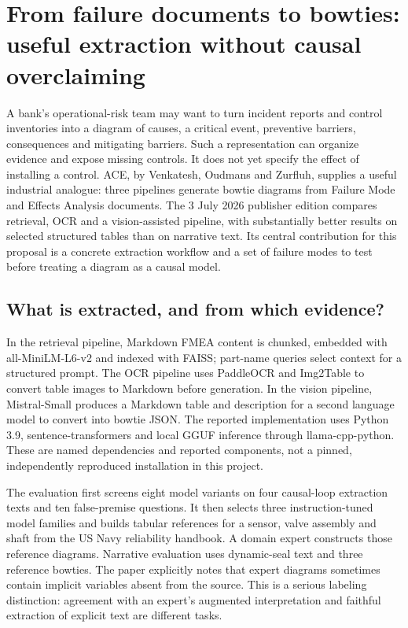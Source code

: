 \section{From failure documents to bowties: useful extraction without causal overclaiming}
\label{exec21:ace-scope}
A bank's operational-risk team may want to turn incident reports and control inventories into a diagram of causes, a critical event, preventive barriers, consequences and mitigating barriers. Such a representation can organize evidence and expose missing controls. It does not yet specify the effect of installing a control. ACE, by Venkatesh, Oudmans and Zurfluh, supplies a useful industrial analogue: three pipelines generate bowtie diagrams from Failure Mode and Effects Analysis documents. The 3 July 2026 publisher edition compares retrieval, OCR and a vision-assisted pipeline, with substantially better results on selected structured tables than on narrative text. Its central contribution for this proposal is a concrete extraction workflow and a set of failure modes to test before treating a diagram as a causal model.~\citep{exec21_ace}

\subsection{What is extracted, and from which evidence?}
\label{exec21:ace-pipeline}
In the retrieval pipeline, Markdown FMEA content is chunked, embedded with all-MiniLM-L6-v2 and indexed with FAISS; part-name queries select context for a structured prompt. The OCR pipeline uses PaddleOCR and Img2Table to convert table images to Markdown before generation. In the vision pipeline, Mistral-Small produces a Markdown table and description for a second language model to convert into bowtie JSON. The reported implementation uses Python 3.9, sentence-transformers and local GGUF inference through llama-cpp-python. These are named dependencies and reported components, not a pinned, independently reproduced installation in this project.~\citep{exec21_ace}

The evaluation first screens eight model variants on four causal-loop extraction texts and ten false-premise questions. It then selects three instruction-tuned model families and builds tabular references for a sensor, valve assembly and shaft from the US Navy reliability handbook. A domain expert constructs those reference diagrams. Narrative evaluation uses dynamic-seal text and three reference bowties. The paper explicitly notes that expert diagrams sometimes contain implicit variables absent from the source. This is a serious labeling distinction: agreement with an expert's augmented interpretation and faithful extraction of explicit text are different tasks.~\citep{exec21_ace}


